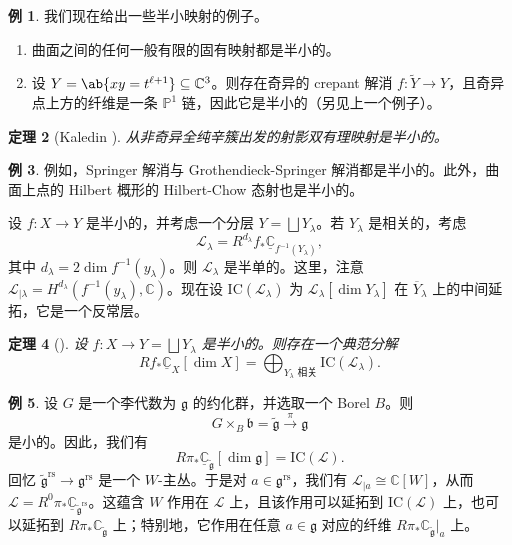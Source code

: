 \documentclass{amsart}
\newtheorem{thm}{定理}[section]
\theoremstyle{definition}
\newtheorem{exm}[thm]{例}
\newtheorem{exms}[thm]{例}
\theoremstyle{remark}
\theoremstyle{plain}
\theoremstyle{definition}
\theoremstyle{remark}
\newcommand{\C}{\mathbb{C}}
\renewcommand{\P}{\mathbb{P}}
\newcommand{\g}{\mathfrak{g}}
\renewcommand{\b}{\mathfrak{b}}
\newcommand{\mc}[1]{\mathcal{#1}}
\newcommand{\mr}[1]{\mathrm{#1}}
\newcommand{\on}[1]{\operatorname{#1}}
\newcommand{\ol}[1]{\overline{#1}}
\newcommand{\ul}[1]{\underline{#1}}
\newcommand{\1}{\mathbf{1}}
\newcommand{\2}{\mathbf{2}}
\newcommand{\3}{\mathbf{3}}
\begin{document}
\begin{exms}
    我们现在给出一些半小映射的例子。
    \begin{enumerate}
        \item 曲面之间的任何一般有限的固有映射都是半小的。
        \item 设 \(Y = \ab\{xy = t^{\ell+1}\} \subseteq \C^3\)。则存在奇异的 crepant 解消 \(f \colon \tilde{Y} \to Y\)，且奇异点上方的纤维是一条 \(\P^1\) 链，因此它是半小的（另见上一个例子）。
    \end{enumerate}
\end{exms}

\begin{thm}[Kaledin {\cite{Kaledin2006}}]
    从非奇异全纯辛簇出发的射影双有理映射是半小的。
\end{thm}

\begin{exm}
    例如，Springer 解消与 Grothendieck-Springer 解消都是半小的。此外，曲面上点的 Hilbert 概形的 Hilbert-Chow 态射也是半小的。
\end{exm}

设 \(f \colon X \to Y\) 是半小的，并考虑一个分层 \(Y = \bigsqcup Y_{\lambda}\)。若 \(Y_{\lambda}\) 是相关的，考虑
\[ \mc{L}_{\lambda} = R^{d_{\lambda}} f_* \ul{\C}_{f^{-1}(Y_{\lambda})}, \]
其中 \(d_{\lambda} = 2 \dim f^{-1} (y_{\lambda})\)。则 \(\mc{L}_{\lambda}\) 是半单的。这里，注意 \(\mc{L}_{|\lambda} = H^{d_{\lambda}}(f^{-1}(y_{\lambda}), \C)\)。现在设 \(\mr{IC}(\mc{L}_{\lambda})\) 为 \(\mc{L}_{\lambda}[\dim Y_{\lambda}]\) 在 \(\ol{Y}_{\lambda}\) 上的中间延拓，它是一个反常层。

\begin{thm}[{\cite{DeCataldoMigliorini2002}}]
    设 \(f \colon X \to Y = \bigsqcup Y_{\lambda}\) 是半小的。则存在一个典范分解
    \[ R f_* \ul{\C}_X[\dim X] = \bigoplus_{Y_{\lambda}\text{ 相关}} \mr{IC}(\mc{L}_{\lambda}). \]
\end{thm}

\begin{exm}
    设 \(G\) 是一个李代数为 \(\g\) 的约化群，并选取一个 Borel \(B\)。则
    \[ G \times_B \b = \tilde{\g} \xrightarrow{\pi} \g \]
    是小的。因此，我们有
    \[ R \pi_* \ul{\C}_{\tilde{\g}} [\dim \g] = \mr{IC}(\mc{L}). \]
    回忆 \(\tilde{\g}^{\on{rs}} \to \g^{\on{rs}}\) 是一个 \(W\)-主丛。于是对 \(a \in \g^{\on{rs}}\)，我们有 \(\mc{L}_{|a} \cong \C[W]\)，从而 \(\mc{L} = R^0 \pi_* \ul{\C}_{\tilde{\g}^{\on{rs}}}\)。这蕴含 \(W\) 作用在 \(\mc{L}\) 上，且该作用可以延拓到 \(\mr{IC}(\mc{L})\) 上，也可以延拓到 \(R \pi_* \C_{\tilde{\g}}\) 上；特别地，它作用在任意 \(a \in \g\) 对应的纤维 \(R \pi_* \C_{\tilde{\g}}|_a\) 上。
\end{exm}
\end{document}

